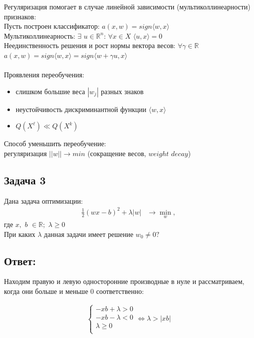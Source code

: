 Регуляризация помогает в случае линейной зависимости (мультиколлинеарности) признаков:\\
Пусть построен классификатор: $a(x, w) = sign\langle w, x \rangle$ \\
Мультиколлинеарность: $\exists$  $u \in \mathbb{R}^{n}$: $\forall x \in X$ $\langle u, x \rangle = 0$ \\
Неединственность решения и рост нормы вектора весов: $\forall \gamma \in \mathbb{R}$ $a(x, w) = sign\langle w, x \rangle = sign \langle w + \gamma u, x \rangle$ \\
\\
Проявления переобучения:
\begin{itemize}
    \item слишком большие веса $|w_j|$ разных знаков
    \item неустойчивость дискриминантной функции $\langle w, x \rangle$
    \item $Q(X^{\ell}) \ll Q(X^{k})$
\end{itemize}
Способ уменьшить переобучение:\\
регуляризация $||w|| \rightarrow min$ (сокращение весов, $weight$ $decay$)

\subsection{Задача 3}

Дана задача оптимизации:
\begin{align*}
    \frac{1}{2}(wx - b)^2 + \lambda|w| & \rightarrow \min_{w},
\end{align*}
где $x,$ $b$ $\in \mathbb{R};$ $\lambda \geq 0$\\
При каких $\lambda$ данная задачи имеет решение $w_0 \neq 0?$

\subsection{Ответ:}

Находим правую и левую односторонние производные в нуле и рассматриваем, когда они больше и меньше 0 соответственно:

\begin{align*}
    \begin{cases}
        -xb + \lambda > 0 \\
        -xb - \lambda < 0 \\
        \lambda \geq 0    \\
    \end{cases} \Leftrightarrow \lambda > |xb|
\end{align*}

